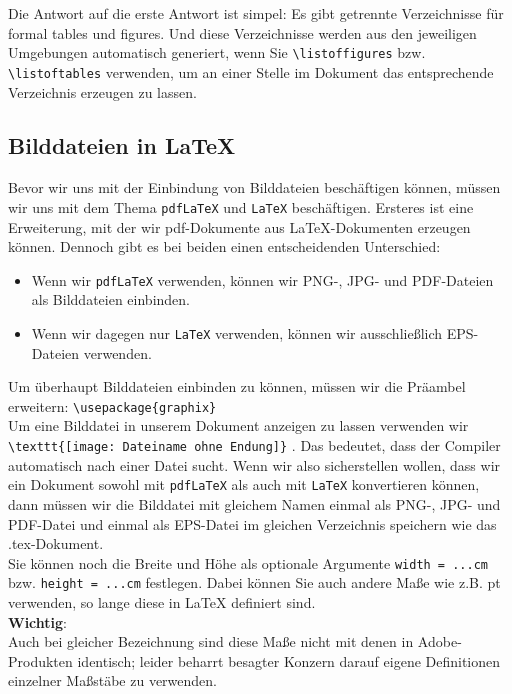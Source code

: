 Die Antwort auf die erste Antwort ist simpel: Es gibt getrennte Verzeichnisse für formal tables und figures. Und diese Verzeichnisse werden aus den jeweiligen Umgebungen automatisch generiert, wenn Sie \verb|\listoffigures| bzw. \verb|\listoftables| verwenden, um an einer Stelle im Dokument das entsprechende Verzeichnis erzeugen zu lassen.

\subsection{Bilddateien in LaTeX}

Bevor wir uns mit der Einbindung von Bilddateien beschäftigen können, müssen wir uns mit dem Thema \verb|pdfLaTeX| und \verb|LaTeX| beschäftigen. Ersteres ist eine Erweiterung, mit der wir pdf-Dokumente aus LaTeX-Dokumenten erzeugen können. Dennoch gibt es bei beiden einen entscheidenden Unterschied:

\begin{itemize}
	\item Wenn wir \verb|pdfLaTeX| verwenden, können wir PNG-, JPG- und PDF-Dateien als Bilddateien einbinden.
	\item Wenn wir dagegen \glqq{}nur\grqq{} \verb|LaTeX| verwenden, können wir ausschließlich EPS-Dateien verwenden.
\end{itemize}

Um überhaupt Bilddateien einbinden zu können, müssen wir die Präambel erweitern: \verb|\usepackage{graphix}|\\

Um eine Bilddatei in unserem Dokument anzeigen zu lassen verwenden wir \verb|\texttt{[image: Dateiname ohne Endung]}| . Das bedeutet, dass der Compiler automatisch nach einer Datei sucht. Wenn wir also sicherstellen wollen, dass wir ein Dokument sowohl mit \verb|pdfLaTeX| als auch mit \verb|LaTeX| konvertieren können, dann müssen wir die Bilddatei mit gleichem Namen einmal als PNG-, JPG- und PDF-Datei und einmal als EPS-Datei im gleichen Verzeichnis speichern wie das .tex-Dokument.\\

Sie können noch die Breite und Höhe als optionale Argumente \verb|width = ...cm| bzw. \verb|height = ...cm| festlegen. Dabei können Sie auch andere Maße wie z.B. pt verwenden, so lange diese in LaTeX definiert sind.\\

\textbf{Wichtig}:\\

Auch bei gleicher Bezeichnung sind diese Maße nicht mit denen in Adobe-Produkten identisch; leider beharrt besagter Konzern darauf eigene Definitionen einzelner Maßstäbe zu verwenden.\\

